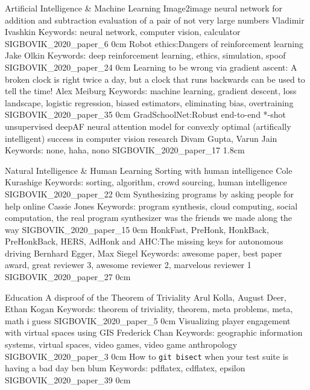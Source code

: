 \addtrack
	{}{Artificial Intelligence \& Machine Learning}
\addpaper
	{Image2image neural network for addition and subtraction evaluation of a pair of not very large numbers}
	{Vladimir Ivashkin}
	{Keywords: neural network, computer vision, calculator}
	{SIGBOVIK_2020_paper_6}
	{0cm}
	{}
\addpaper
	{Robot ethics:\@ Dangers of reinforcement learning}
	{Jake Olkin}
	{Keywords: deep reinforcement learning, ethics, simulation, spoof}
	{SIGBOVIK_2020_paper_24}
	{0cm}
	{}
\addpaper
	{Learning to be wrong via gradient ascent: A broken clock is right twice a day, but a clock that runs backwards can be used to tell the time!}
	{Alex Meiburg}
	{Keywords: machine learning, gradient descent, loss landscape, logistic regression, biased estimators, eliminating bias, overtraining}
	{SIGBOVIK_2020_paper_35}
	{0cm}
	{}
\addpaper
	{GradSchoolNet:\@ Robust end-to-end *-shot unsupervised deepAF neural attention model for convexly optimal (artifically intelligent) success in computer vision research}
	{Divam Gupta, Varun Jain}
	{Keywords: none, haha, nono}
	{SIGBOVIK_2020_paper_17}
	{1.8cm}
	{}

\addtrack
	{}{Natural Intelligence \& Human Learning}
\addpaper
	{Sorting with human intelligence}
	{Cole Kurashige}
	{Keywords: sorting, algorithm, crowd sourcing, human intelligence}
	{SIGBOVIK_2020_paper_22}
	{0cm}
	{}
\addpaper
	{Synthesizing programs by asking people for help online}
	{Cassie Jones}
	{Keywords: program synthesis, cloud computing, social computation, the real program synthesizer was the friends we made along the way}
	{SIGBOVIK_2020_paper_15}
	{0cm}
	{}
\addpaper
	{HonkFast, PreHonk, HonkBack, PreHonkBack, HERS, AdHonk and AHC:\@ The missing keys for autonomous driving}
	{Bernhard Egger, Max Siegel}
	{Keywords: awesome paper, best paper award, great reviewer 3, awesome reviewer 2, marvelous reviewer 1}
	{SIGBOVIK_2020_paper_27}
	{0cm}
	{}

\addtrack
	{}{Education}
\addpaper
	{A disproof of the Theorem of Triviality}
	{Arul Kolla, August Deer, Ethan Kogan}
	{Keywords: theorem of triviality, theorem, meta problems, meta, math i guess}
	{SIGBOVIK_2020_paper_5}
	{0cm}
	{}
\addpaper
	{Visualizing player engagement with virtual spaces using GIS}
	{Frederick Chan}
	{Keywords: geographic information systems, virtual spaces, video games, video game anthropology}
	{SIGBOVIK_2020_paper_3}
	{0cm}
	{}
\addpaper
	{How to \texttt{git bisect} when your test suite is having a bad day}
	{ben blum}
	{Keywords: pdflatex, cdflatex, epsilon}
	{SIGBOVIK_2020_paper_39}
	{0cm}
	{}

